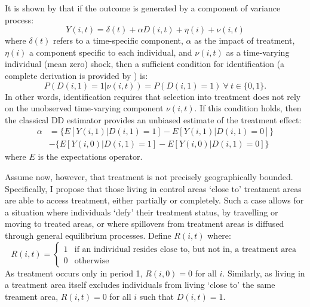 It is shown by \citet{AshenfelterCard1985} that if the outcome is generated by
a component of variance process:
\begin{equation}
\label{Seqn:COV}
Y(i,t)=\delta(t) + \alpha D(i,t)+\eta(i)+\nu(i,t)
\end{equation}
where $\delta(t)$ refers to a time-specific component, $\alpha$ as the impact of 
treatment, $\eta(i)$ a component specific to each individual, and $\nu(i,t)$ as 
a time-varying individual (mean zero) shock, then a sufficient condition for 
identification (a complete derivation is provided by \citet{Abadie2005}) is:
\begin{equation}
\label{Seqn:ID}
P(D(i,1)=1|\nu(i,t))=P(D(i,1)=1) \ \forall\ t\in\{0,1\}.
\end{equation}
In other words, identification requires that selection into treatment does not
rely on the unobserved time-varying component $\nu(i,t)$.  If this condition 
holds, then the classical DD estimator provides an unbiased estimate of the
treatment effect:
\begin{equation}
\label{Seqn:DD}
\begin{split}
\alpha&=\{E[Y(i,1)|D(i,1)=1]-E[Y(i,1)|D(i,1)=0]\} \\
      &-\{E[Y(i,0)|D(i,1)=1]-E[Y(i,0)|D(i,1)=0]\}
\end{split}
\end{equation}
where $E$ is the expectations operator.

Assume now, however, that treatment is not precisely geographically bounded.  
Specifically, I propose that those living in control areas `close to' treatment 
areas are able to access treatment, either partially or completely.  Such a 
case allows for a situation where individuals `defy' their treatment status, by 
travelling or moving to treated areas, or where spillovers from treatment 
areas is diffused through general equilibrium processes.  Define $R(i,t)$ 
where:
\begin{equation}
\nonumber
 R(i,t) =
  \begin{cases}
   1  & \text{if an individual resides close to, but not in, a treatment area} \\
   0  & \text{otherwise} 
  \end{cases}
\end{equation}
As treatment occurs only in period 1, $R(i,0)=0$ for all $i$.  Similarly, as 
living in a treatment area itself excludes individuals from living `close to' 
the same treament area, $R(i,t)=0$ for all $i$ such that $D(i,t)=1$.

